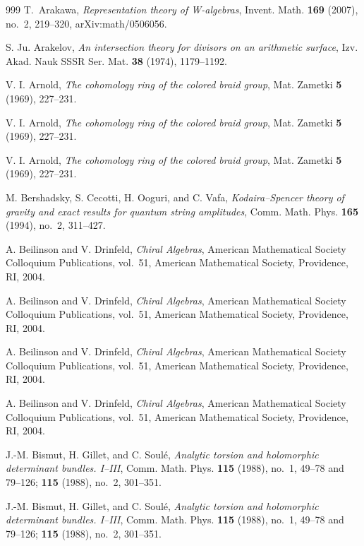 \begin{thebibliography}{999}
T.~Arakawa, \emph{Representation theory of W-algebras}, Invent. Math. \textbf{169} (2007), no.~2, 219--320, arXiv:math/0506056.

S. Ju. Arakelov, \emph{An intersection theory for divisors on an arithmetic surface}, Izv. Akad. Nauk SSSR Ser. Mat. \textbf{38} (1974), 1179--1192.

V. I. Arnold, \emph{The cohomology ring of the colored braid group}, Mat. Zametki \textbf{5} (1969), 227--231.

V. I. Arnold, \emph{The cohomology ring of the colored braid group}, Mat. Zametki \textbf{5} (1969), 227--231.

V. I. Arnold, \emph{The cohomology ring of the colored braid group}, Mat. Zametki \textbf{5} (1969), 227--231.

M. Bershadsky, S. Cecotti, H. Ooguri, and C. Vafa, \emph{Kodaira--Spencer theory of gravity and exact results for quantum string amplitudes}, Comm. Math. Phys. \textbf{165} (1994), no.~2, 311--427.

A. Beilinson and V. Drinfeld, \emph{Chiral Algebras}, American Mathematical Society Colloquium Publications, vol.~51, American Mathematical Society, Providence, RI, 2004.

A. Beilinson and V. Drinfeld, \emph{Chiral Algebras}, American Mathematical Society Colloquium Publications, vol.~51, American Mathematical Society, Providence, RI, 2004.

A. Beilinson and V. Drinfeld, \emph{Chiral Algebras}, American Mathematical Society Colloquium Publications, vol.~51, American Mathematical Society, Providence, RI, 2004.

A. Beilinson and V. Drinfeld, \emph{Chiral Algebras}, American Mathematical Society Colloquium Publications, vol.~51, American Mathematical Society, Providence, RI, 2004.

J.-M. Bismut, H. Gillet, and C. Soul\'e, \emph{Analytic torsion and holomorphic determinant bundles. I--III}, Comm. Math. Phys. \textbf{115} (1988), no.~1, 49--78 and 79--126; \textbf{115} (1988), no.~2, 301--351.

J.-M. Bismut, H. Gillet, and C. Soul\'e, \emph{Analytic torsion and holomorphic determinant bundles. I--III}, Comm. Math. Phys. \textbf{115} (1988), no.~1, 49--78 and 79--126; \textbf{115} (1988), no.~2, 301--351.


\end{thebibliography}
